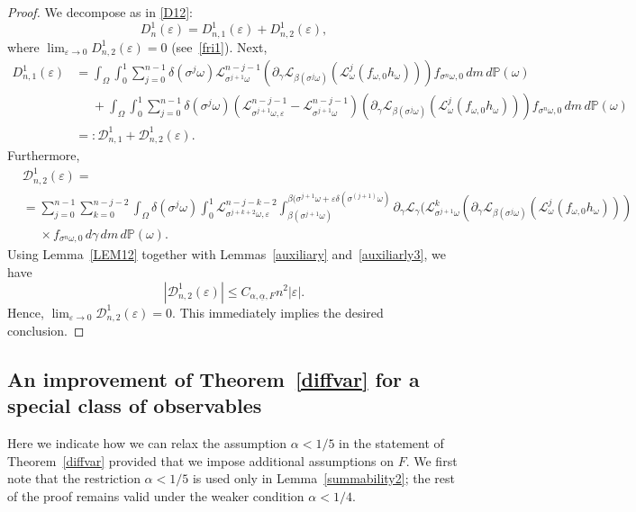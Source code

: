 \documentclass[12pt,reqno,a4paper]{article}
\newcommand{\ve}{\varepsilon}
\begin{document}
\begin{proof}
	We decompose as in \eqref{D12}:
	$$
	D_n^1(\varepsilon) = D_{n,1}^1(\varepsilon)+D_{n, 2}^1(\varepsilon),
	$$
	where $\lim_{\ve \to 0} D_{n, 2}^1(\varepsilon) = 0$ (see~\eqref{fri1}). Next,
	\begin{align*}
		D_{n,1}^1(\varepsilon) &=\int_\Omega\int_0^1 \sum_{j=0}^{n-1}\delta (\sigma^j \omega)\mathcal L_{\sigma^{j+1}\omega}^{n-j-1}\left (\partial_\gamma \mathcal L_{\beta(\sigma^j \omega)}(\mathcal L_\omega^j(f_{\omega, 0}h_\omega))\right )f_{\sigma^n \omega,0}\, dm\, d\mathbb P(\omega)\\
		&\phantom{=}+\int_\Omega\int_0^1 \sum_{j=0}^{n-1}\delta (\sigma^j \omega)(\mathcal L_{\sigma^{j+1}\omega, \varepsilon}^{n-j-1}-\mathcal L_{\sigma^{j+1}\omega}^{n-j-1})\left (\partial_\gamma \mathcal L_{\beta(\sigma^j \omega)}(\mathcal L_\omega^j(f_{\omega, 0}h_\omega))\right )f_{\sigma^n \omega,0}\, dm\, d\mathbb P(\omega)\\
		&=:\mathcal D_{n, 1}^1+\mathcal D_{n, 2}^1(\ve).
	\end{align*}
	Furthermore,
	\[
	\begin{split}
		& \mathcal D_{n, 2}^1(\ve)=\\
		&= \sum_{j=0}^{n-1}\sum_{k=0}^{n-j-2}\int_\Omega \delta(\sigma^j \omega) \int_0^1 \mathcal L_{\sigma^{j+k+2}\omega, \varepsilon}^{n-j-k-2}\int_{\beta(\sigma^{j+1}\omega)}^{\beta(\sigma^{j+1}\omega+\varepsilon \delta(\sigma^{(j+1)}\omega)}\partial_\gamma \mathcal L_\gamma (\mathcal L_{\sigma^{j+1}\omega}^k (\partial_\gamma \mathcal L_{\beta(\sigma^j \omega)}(\mathcal L_{\omega}^j(f_{\omega, 0}h_\omega))) \\
		&\phantom{=}\times f_{\sigma^n \omega, 0}\, d\gamma \, dm\, d\mathbb P(\omega).
	\end{split}
	\]
	Using Lemma~\ref{LEM12} together with Lemmas~\ref{auxiliary} and~\ref{auxiliarly3}, we have
	$$
	|\mathcal D_{n, 2}^1(\ve)| \le C_{\alpha, \underline{\alpha}, F}n^2|\varepsilon|.
	$$
	Hence, $\lim_{\ve \to 0} \mathcal D_{n, 2}^1(\ve) = 0$. This immediately implies the desired conclusion.
	
\end{proof}

\subsection{An improvement of Theorem~\ref{diffvar} for a special class of observables}
Here we indicate how we can relax the assumption $\alpha < 1/5$ in the statement of Theorem~\ref{diffvar} provided that we impose additional assumptions on $F$. We first note that the restriction $\alpha < 1/5$ is used only in Lemma~\ref{summability2}; the rest of the proof remains valid under the weaker condition $\alpha < 1/4$.
\end{document}
